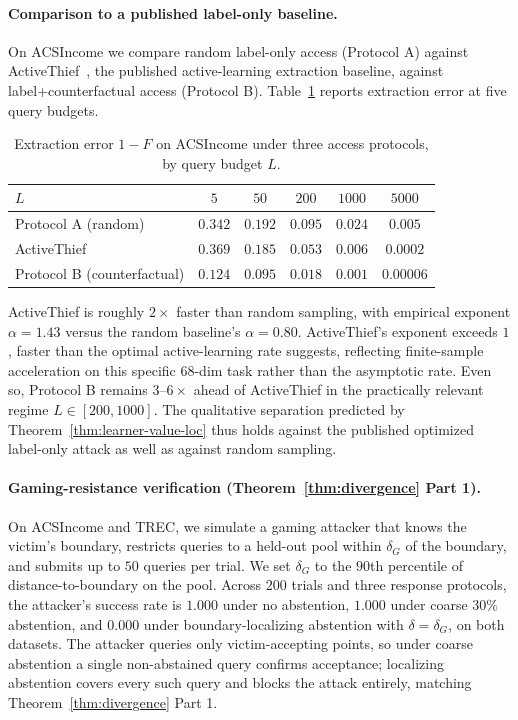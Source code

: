 \documentclass[runningheads,envcountsame]{llncs}
\begin{document}
\paragraph{Comparison to a published label-only baseline.} On ACSIncome we compare random label-only access (Protocol A) against ActiveThief~\cite{pal2020activethief}, the published active-learning extraction baseline, against label+counterfactual access (Protocol B). Table~\ref{tab:activethief} reports extraction error at five query budgets.

\begin{table}[t]
\centering
\caption{Extraction error $1 - F$ on ACSIncome under three access protocols, by query budget $L$.}
\label{tab:activethief}
\begin{tabular}{lccccc}
\toprule
$L$ & $5$ & $50$ & $200$ & $1000$ & $5000$ \\
\midrule
Protocol A (random)          & $0.342$ & $0.192$ & $0.095$ & $0.024$  & $0.005$ \\
ActiveThief                  & $0.369$ & $0.185$ & $0.053$ & $0.006$  & $0.0002$ \\
Protocol B (counterfactual)  & $0.124$ & $0.095$ & $0.018$ & $0.001$  & $0.00006$ \\
\bottomrule
\end{tabular}
\end{table}

ActiveThief is roughly $2\times$ faster than random sampling, with empirical exponent $\alpha = 1.43$ versus the random baseline's $\alpha = 0.80$. ActiveThief's exponent exceeds $1$, faster than the optimal active-learning rate suggests, reflecting finite-sample acceleration on this specific 68-dim task rather than the asymptotic rate. Even so, Protocol B remains $3$--$6\times$ ahead of ActiveThief in the practically relevant regime $L \in [200, 1000]$. The qualitative separation predicted by Theorem~\ref{thm:learner-value-loc} thus holds against the published optimized label-only attack as well as against random sampling.

\paragraph{Gaming-resistance verification (Theorem~\ref{thm:divergence} Part 1).} On ACSIncome and TREC, we simulate a gaming attacker that knows the victim's boundary, restricts queries to a held-out pool within $\delta_G$ of the boundary, and submits up to $50$ queries per trial. We set $\delta_G$ to the $90$th percentile of distance-to-boundary on the pool. Across $200$ trials and three response protocols, the attacker's success rate is $1.000$ under no abstention, $1.000$ under coarse $30\%$ abstention, and $0.000$ under boundary-localizing abstention with $\delta = \delta_G$, on both datasets. The attacker queries only victim-accepting points, so under coarse abstention a single non-abstained query confirms acceptance; localizing abstention covers every such query and blocks the attack entirely, matching Theorem~\ref{thm:divergence} Part 1.
\end{document}
